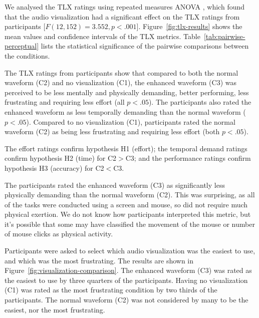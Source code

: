 We analysed the TLX ratings using repeated measures ANOVA \citep[p.~409]{Shalabh2009}, which found that the audio
visualization had a significant effect on the TLX ratings from participants [$F(12,152)=3.552, p<.001$].
Figure~\ref{fig:tlx-results} shows the mean values and confidence intervals of the TLX metrics.
Table~\ref{tab:pairwise-perceptual} lists the statistical significance of the pairwise comparisons between the
conditions.

The TLX ratings from participants show that compared to both the normal waveform (C2) and no visualization (C1),
the enhanced waveform (C3) was perceived to be less mentally and physically demanding, better performing, less
frustrating and requiring less effort (all $p<.05$).  The participants also rated the enhanced waveform as less
temporally demanding than the normal waveform ($p<.05$).  Compared to no visualization (C1), participants rated
the normal waveform (C2) as being less frustrating and requiring less effort (both $p<.05$). 

The effort ratings confirm hypothesis H1 (effort); the temporal demand ratings confirm hypothesis H2 (time) for
C2$>$C3; and the performance ratings confirm hypothesis H3 (accuracy) for C2$<$C3.



The participants rated the enhanced waveform (C3) as significantly less physically demanding than the normal waveform
(C2).  This was surprising, as all of the tasks were conducted using a screen and mouse, so did not require much
physical exertion.  We do not know how participants interpreted this metric, but it's possible that some may have
classified the movement of the mouse or number of mouse clicks as physical activity.

Participants were asked to select which audio visualization was the easiest to use, and which was the most frustrating.
The results are shown in Figure~\ref{fig:visualization-comparison}.  The enhanced waveform (C3) was rated as the
easiest to use by three quarters of the participants.  Having no visualization (C1) was rated as the most frustrating
condition by two thirds of the participants. The normal waveform (C2) was not considered by many to be the easiest, nor
the most frustrating.

